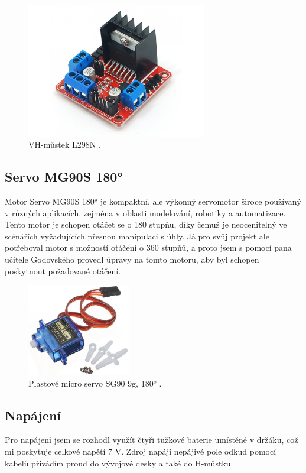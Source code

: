 \documentclass[12pt, a4paper,
oneside
openany
]{report}
\begin{document}
	\begin{figure}[ht]
		\centering 
		\includegraphics[width=0.7\textwidth]{image/h-mustek.png} %
		\caption{VH-můstek L298N \cite{h-mustek}.} 
	\end{figure}
 
\newpage
\subsection{Servo MG90S 180°}
\noindent Motor Servo MG90S 180° je kompaktní, ale výkonný servomotor široce používaný v různých aplikacích, zejména v oblasti modelování, robotiky a automatizace. Tento motor je schopen otáčet se o 180 stupňů, díky čemuž je neocenitelný ve scénářích vyžadujících přesnou manipulaci s úhly. Já pro svůj projekt ale potřeboval motor s možností otáčení o 360 stupňů, a proto jsem s pomocí pana učitele Godovského provedl úpravy na tomto motoru, aby byl schopen poskytnout požadované otáčení.

	\begin{figure}[ht]
		\centering 
		\includegraphics[width=0.4\textwidth]{image/servo.jpg} %
		\caption{Plastové micro servo SG90 9g, 180° \cite{servo}.} 
	\end{figure}

\subsection{Napájení}
\noindent Pro napájení jsem se rozhodl využít čtyři tužkové baterie umístěné v držáku, což mi poskytuje celkové napětí 7 V. Zdroj napájí nepájivé pole odkud pomocí kabelů přivádím proud do vývojové desky a také do H-můstku.
\end{document}
